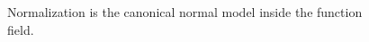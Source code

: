 \begin{figure}[htbp]\centering
{}
\caption{Normalization is the canonical normal model inside the function field.}\label{fig:vi28-synthesis}\end{figure}
